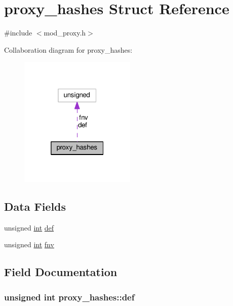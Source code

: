 \hypertarget{structproxy__hashes}{}\section{proxy\+\_\+hashes Struct Reference}
\label{structproxy__hashes}


{\ttfamily \#include $<$mod\+\_\+proxy.\+h$>$}



Collaboration diagram for proxy\+\_\+hashes\+:
\nopagebreak
\begin{figure}[H]
\begin{center}
\leavevmode
\includegraphics[width=157pt]{structproxy__hashes__coll__graph}
\end{center}
\end{figure}
\subsection*{Data Fields}
\begin{DoxyCompactItemize}
\item 
unsigned \hyperlink{pcre_8txt_a42dfa4ff673c82d8efe7144098fbc198}{int} \hyperlink{structproxy__hashes_acb9f2008dcbfc80b3545d2df2219284a}{def}
\item 
unsigned \hyperlink{pcre_8txt_a42dfa4ff673c82d8efe7144098fbc198}{int} \hyperlink{structproxy__hashes_a229642e1523de07c9edb64b67174dd90}{fnv}
\end{DoxyCompactItemize}


\subsection{Field Documentation}
\subsubsection[{\texorpdfstring{def}{def}}]{\setlength{\rightskip}{0pt plus 5cm}unsigned {\bf int} proxy\+\_\+hashes\+::def}\hypertarget{structproxy__hashes_acb9f2008dcbfc80b3545d2df2219284a}{}\label{structproxy__hashes_acb9f2008dcbfc80b3545d2df2219284a}
